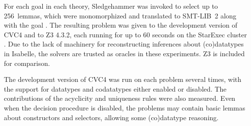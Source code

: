 
For each goal in each theory, Sledgehammer was invoked to select up to
256~lemmas, which were monomorphized and translated to SMT-LIB~2
along with the goal \cite{blanchette-et-al-2013-smt}. The resulting problem was
given to the development version of CVC4 and to Z3 4.3.2, each running for up to 60
seconds on the StarExec cluster \cite{stump-et-al-2014-starexec}.
Due to the lack of machinery for reconstructing inferences about (co)datatypes
in Isabelle, the solvers are trusted as oracles in these experiments. Z3
is included for comparison.

The development version of CVC4 was run on each problem several times, with the
support for datatypes and codatatypes either enabled or disabled. The
contributions of the acyclicity and uniqueness rules were also measured.
Even when the
decision procedure is disabled, the problems may contain
basic lemmas about constructors and selectors, allowing some (co)datatype
reasoning.



\newcommand\nummodden{num\hbox{\rm\_}mod\hbox{\rm\_}den}

